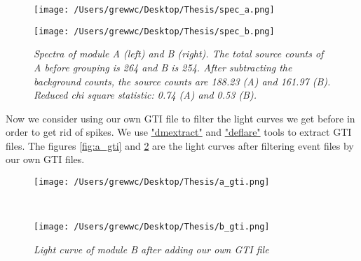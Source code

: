 \documentclass[12pt]{report}
\newcommand{\mycaption}[1]{\caption{\textit{\footnotesize #1}}}
\begin{document}
        \begin{figure}[!ht]
          \begin{minipage}{0.45\textwidth}
            \begin{center} 
                \texttt{[image: /Users/grewwc/Desktop/Thesis/spec\_a.png]}
            \end{center}
            \end{minipage}
          \begin{minipage}{0.45\textwidth}
            \begin{center}
            \texttt{[image: /Users/grewwc/Desktop/Thesis/spec\_b.png]}
            \end{center}
          \end{minipage}
          \centering
          \begin{minipage}{0.8\textwidth}
          \mycaption{Spectra of module A (left) and B (right). The total source counts of A before grouping is 
                      264 and B is 254. After subtracting the background counts, the source counts are 188.23 (A)
                      and 161.97 (B). Reduced chi square statistic: 0.74 (A) and 0.53 (B).}
          \label{fig:spectra_region3}
          \end{minipage}
          \end{figure}
        
        \indent Now we consider using our own GTI file to filter the light curves we get before in order to get 
        rid of spikes.
        We use \href{http://cxc.harvard.edu/ciao/ahelp/dmextract.html}{"dmextract"} and 
        \href{http://cxc.harvard.edu/ciao/ahelp/deflare.html}{"deflare"} tools to extract GTI files. The figures 
        \ref{fig:a_gti} and \ref{fig:b_gti} are the light curves after filtering event files by our own GTI files. 
        \begin{figure}[!ht] 
          \begin{minipage}{1\textwidth}
            \begin{center} 
                \texttt{[image: /Users/grewwc/Desktop/Thesis/a\_gti.png]}
                \mycaption{Light curve of module A after adding our own GTI file}
                \label{fig:a_gti}
            \end{center}
            \end{minipage}
            \\
          \begin{minipage}{1\textwidth}
          \begin{center}
            \texttt{[image: /Users/grewwc/Desktop/Thesis/b\_gti.png]}
            \mycaption{Light curve of module B after adding our own GTI file}
            \label{fig:b_gti}
            \end{center}
          \end{minipage}
          \centering
        \end{figure}
\end{document}
